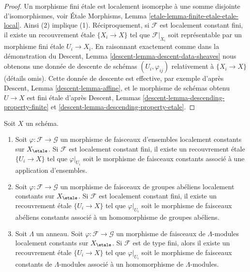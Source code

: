 \begin{proof}
Un morphisme fini \'etale est localement isomorphe \`a une somme disjointe
d'isomorphismes, voir
\'Etale Morphisms, Lemma \ref{etale-lemma-finite-etale-etale-local}.
Ainsi (2) implique (1). R\'eciproquement, si $\mathcal{F}$ est localement
constant fini, il existe un recouvrement \'etale $\{X_i \to X\}$ tel que
$\mathcal{F}|_{X_i}$ soit repr\'esentable par un morphisme fini \'etale $U_i \to X_i$.
En raisonnant exactement comme dans la d\'emonstration du
Descent, Lemma \ref{descent-lemma-descent-data-sheaves}
nous obtenons une donn\'ee de descente de sch\'emas $(U_i, \varphi_{ij})$ relativement \`a
$\{X_i \to X\}$ (d\'etails omis). Cette donn\'ee de descente est effective, par
exemple d'apr\`es Descent, Lemma \ref{descent-lemma-affine},
et le morphisme de sch\'emas obtenu $U \to X$ est fini \'etale
d'apr\`es Descent, Lemmas \ref{descent-lemma-descending-property-finite} et
\ref{descent-lemma-descending-property-etale}.
\end{proof}

\begin{lemma}
\label{lemma-morphism-locally-constant}
Soit $X$ un sch\'ema.
\begin{enumerate}
\item Soit $\varphi : \mathcal{F} \to \mathcal{G}$ un morphisme
de faisceaux d'ensembles localement constants sur $X_\etale$.
Si $\mathcal{F}$ est localement constant fini, il existe un
recouvrement \'etale $\{U_i \to X\}$ tel que
$\varphi|_{U_i}$ soit le morphisme de faisceaux constants associ\'e \`a
une application d'ensembles.
\item Soit $\varphi : \mathcal{F} \to \mathcal{G}$ un morphisme
de faisceaux de groupes ab\'eliens localement constants sur $X_\etale$.
Si $\mathcal{F}$ est localement constant fini, il existe un recouvrement \'etale
$\{U_i \to X\}$ tel que $\varphi|_{U_i}$ soit le morphisme de
faisceaux ab\'eliens constants associ\'e \`a un homomorphisme de groupes ab\'eliens.
\item Soit $\Lambda$ un anneau.
Soit $\varphi : \mathcal{F} \to \mathcal{G}$ un morphisme
de faisceaux de $\Lambda$-modules localement constants sur $X_\etale$.
Si $\mathcal{F}$ est de type fini, alors il existe un recouvrement \'etale
$\{U_i \to X\}$ tel que $\varphi|_{U_i}$ soit le morphisme de
faisceaux constants de $\Lambda$-modules associ\'e \`a un homomorphisme de $\Lambda$-modules.
\end{enumerate}
\end{lemma}

